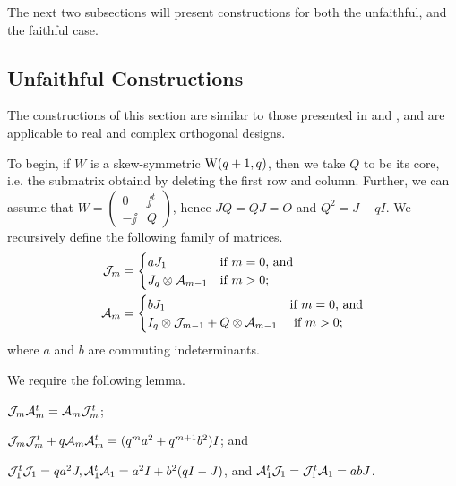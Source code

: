 \documentclass[../../../main]{subfiles}
\begin{document}
The next two subsections will present constructions for both the unfaithful, and the faithful case.

\dinkus

\subsection{Unfaithful Constructions}

The constructions of this section are similar to those presented in \cite{fender-quh} and \cite{pender_2020}, and are applicable to real and complex orthogonal designs.

To begin, if $W$ is a skew-symmetric $\text{W}(q+1,q)$, then we take $Q$ to be its core, i.e. the submatrix obtaind by deleting the first row and column. Further, we can assume that $W=\left(\begin{smallmatrix} 0 & \jj^t \\ -\jj & Q \end{smallmatrix}\right)$, hence $JQ=QJ=O$ and $Q^2=J-qI$. We recursively define the following family of matrices.
\begin{align*}
 \mathcal{J}_m&=\begin{cases}
        aJ_1 & \text{if $m=0$, and} \\
        J_q \otimes \mathcal{A}_{m-1} & \text{if $m>0$;}
       \end{cases} \\
 \mathcal{A}_m&=\begin{cases}
      bJ_1 & \text{if $m=0$, and} \\
      I_q \otimes \mathcal{J}_{m-1} + Q \otimes \mathcal{A}_{m-1} & \text{ if $m>0$;}
     \end{cases}
\end{align*}
where $a$ and $b$ are commuting indeterminants.

We require the following lemma.

\begin{lem}
 \begin{defenum}
  \item[]
  \item\label{lem-am-1} $\mathcal{J}_m\mathcal{A}_m^t = \mathcal{A}_m\mathcal{J}_m^t$;
  \item\label{lem-am-2} $\mathcal{J}_m\mathcal{J}_m^t + q\mathcal{A}_m\mathcal{A}_m^t = (q^ma^2+q^{m+1}b^2)I$; and
  \item\label{lem-am-3} $\mathcal{J}_1^t\mathcal{J}_1 = qa^2J, \mathcal{A}_1^t\mathcal{A}_1=a^2I+b^2(qI-J)$, and $\mathcal{A}_1^t\mathcal{J}_1=\mathcal{J}_1^t\mathcal{A}_1=abJ$.
 \end{defenum}
\end{lem}
\end{document}
